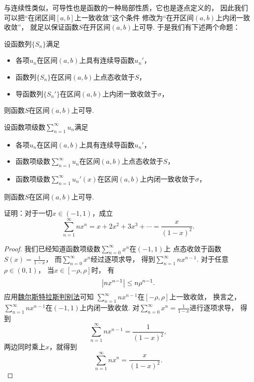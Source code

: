 与连续性类似，可导性也是函数的一种局部性质，它也是逐点定义的，
因此我们可以把“在闭区间\([a,b]\)上一致收敛”这个条件
修改为“在开区间\((a,b)\)上内闭一致收敛”，
就足以保证函数\(S\)在开区间\((a,b)\)上可导.
于是我们有下述两个命题：
\begin{proposition}
设函数列\(\{S_n\}\)满足\begin{itemize}
	\item 各项\(u_n\)在区间\((a,b)\)上具有连续导函数\(u_n'\)，
	\item 函数列\(\{S_n\}\)在区间\((a,b)\)上点态收敛于\(S\)，
	\item 导函数列\(\{S_n'\}\)在区间\((a,b)\)上内闭一致收敛于\(\sigma\)，
\end{itemize}
则函数\(S\)在区间\((a,b)\)上可导.
\end{proposition}
\begin{proposition}
设函数项级数\(\sum_{n=1}^\infty u_n\)满足\begin{itemize}
	\item 各项\(u_n\)在区间\((a,b)\)上具有连续导函数\(u_n'\)，
	\item 函数项级数\(\sum_{n=1}^\infty u_n\)在区间\((a,b)\)上点态收敛于\(S\)，
	\item 函数项级数\(\sum_{n=1}^\infty u_n'(x)\)在区间\((a,b)\)上内闭一致收敛于\(\sigma\)，
\end{itemize}
则函数\(S\)在区间\((a,b)\)上可导.
\end{proposition}

\begin{example}
证明：对于一切\(x\in(-1,1)\)，成立\[
	\sum_{n=1}^\infty n x^n
	= x + 2x^2 + 3x^3 + \dotsb
	= \frac{x}{(1-x)^2}.
\]
\begin{proof}
我们已经知道函数项级数\(\sum_{n=0}^\infty x^n\)在\((-1,1)\)上
点态收敛于函数\(S(x) = \frac1{1-x}\)，
而\(\sum_{n=0}^\infty x^n\)经过逐项求导，
得到\(\sum_{n=1}^\infty n x^{n-1}\).
对于任意\(\rho\in(0,1)\)，
当\(x\in[-\rho,\rho]\)时，
有\[
	\abs{n x^{n-1}} \leq n \rho^{n-1}.
\]
应用\hyperref[theorem:无穷级数.魏尔斯特拉斯判别法]{魏尔斯特拉斯判别法}可知
\(\sum_{n=1}^\infty n x^{n-1}\)在\([-\rho,\rho]\)上一致收敛，
换言之，\(\sum_{n=1}^\infty n x^{n-1}\)在\((-1,1)\)上内闭一致收敛.
对\(\sum_{n=0}^\infty x^n = \frac1{1-x}\)进行逐项求导，
得到\[
	\sum_{n=1}^\infty n x^{n-1}
	= \frac1{(1-x)^2},
\]
两边同时乘上\(x\)，就得到\[
	\sum_{n=1}^\infty n x^n
	= \frac{x}{(1-x)^2}.
\]
\end{proof}
\end{example}

